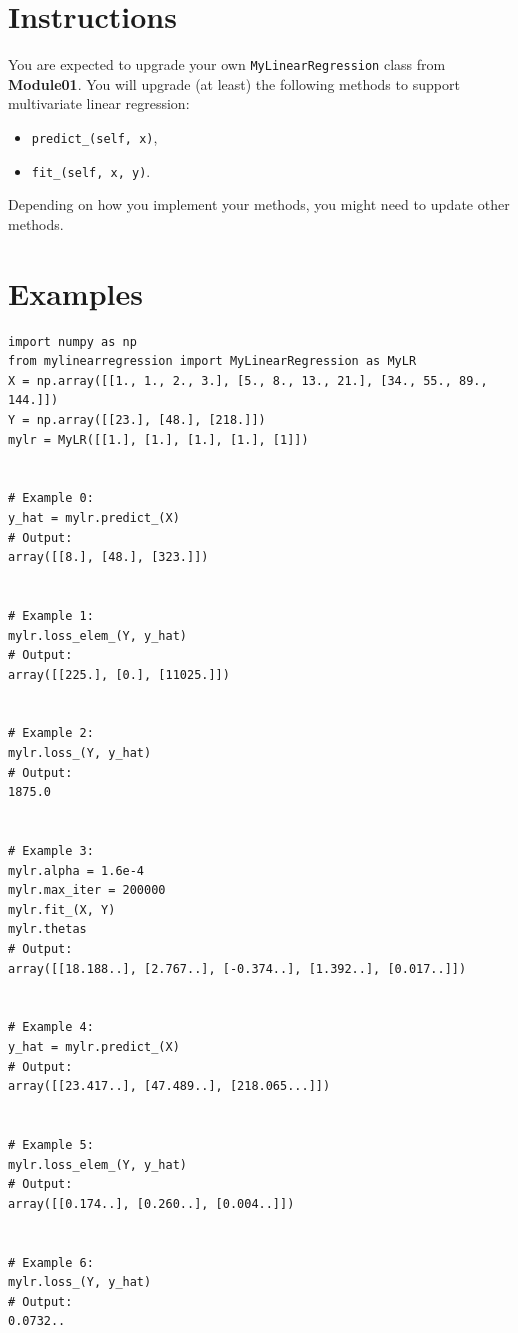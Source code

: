 \documentclass{42-en}
\begin{document}
\section*{Instructions}
You are expected to upgrade your own \texttt{MyLinearRegression} class from \textbf{Module01}.
You will upgrade (at least) the following methods to support multivariate linear regression:
\begin{itemize}
  \item \texttt{predict\_(self, x)}, 
  \item \texttt{fit\_(self, x, y)}.
\end{itemize}
Depending on how you implement your methods, you might need to update other methods.

\section*{Examples}
\begin{verbatim}
import numpy as np
from mylinearregression import MyLinearRegression as MyLR
X = np.array([[1., 1., 2., 3.], [5., 8., 13., 21.], [34., 55., 89., 144.]])
Y = np.array([[23.], [48.], [218.]])
mylr = MyLR([[1.], [1.], [1.], [1.], [1]])


# Example 0:
y_hat = mylr.predict_(X)
# Output:
array([[8.], [48.], [323.]])


# Example 1:
mylr.loss_elem_(Y, y_hat)
# Output:
array([[225.], [0.], [11025.]])


# Example 2:
mylr.loss_(Y, y_hat)
# Output:
1875.0


# Example 3:
mylr.alpha = 1.6e-4
mylr.max_iter = 200000
mylr.fit_(X, Y)
mylr.thetas
# Output:
array([[18.188..], [2.767..], [-0.374..], [1.392..], [0.017..]])


# Example 4:
y_hat = mylr.predict_(X)
# Output:
array([[23.417..], [47.489..], [218.065...]])


# Example 5:
mylr.loss_elem_(Y, y_hat)
# Output:
array([[0.174..], [0.260..], [0.004..]])


# Example 6:
mylr.loss_(Y, y_hat)
# Output:
0.0732..
\end{verbatim}


\newpage
\end{document}
